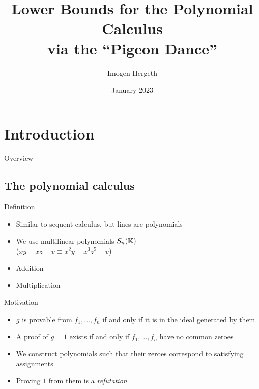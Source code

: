 \documentclass[xcolor={dvipsnames}, aspectratio=169, handout]{beamer}
\title{Lower Bounds for the Polynomial Calculus\\via the ``Pigeon Dance''}
\author{Imogen Hergeth}
\date{January 2023}
\newcommand{\Sn}{S_n(\KK)}
\begin{document}
\maketitle

\section{Introduction}

\begin{frame}{Overview}
    \tableofcontents[hideallsubsections]
\end{frame}

\subsection{The polynomial calculus}
\begin{frame}{Definition}
    \begin{itemize}[<+->]
        \item Similar to sequent calculus, but lines are polynomials
        \item We use multilinear polynomials $\Sn$\\
            ($xy + xz + v \equiv x^2y + x^3z^5 + v$)
        \item Addition
        \begin{prooftree}
        \end{prooftree}
        \item Multiplication
        \begin{prooftree}
        \end{prooftree}
    \end{itemize}
\end{frame}

\begin{frame}{Motivation}
    \begin{itemize}[<+->]
        \item $g$ is provable from $f_1, \ldots, f_n$ if and only if it is in the ideal generated by them
        \item A proof of $g=1$ exists if and only if $f_1, \ldots, f_n$ have no common zeroes
        \item We construct polynomials such that their zeroes correspond to satisfying assignments
        \item Proving $1$ from them is a \textit{refutation}
    \end{itemize}
\end{frame}
\end{document}
